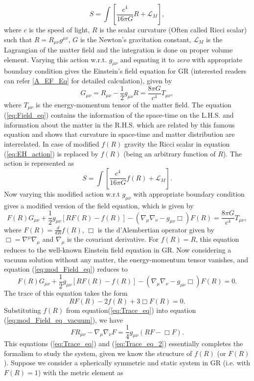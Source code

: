 \documentclass[12pt,a4paper,oneside]{book}
\newcommand{\eq}[2]{\begin{equation} \label{eq:#1} #2 \end{equation}}
\newcommand{\Eref}[1]{(\ref{eq:#1})}
\begin{document}
\eq{EH_action}{S = \int \left[ \frac{c^4}{16\pi G}R + \mathcal{L}_M\right], }
where $c$ is the speed of light, $R$ is the scalar curvature (Often called Ricci scalar) such that $R = R_{\mu\nu}g^{\mu\nu}$, $G$ is the Newton's gravitation constant, $\mathcal{L}_M$ is the Lagrangian of the matter field and the integration is done on proper volume element. Varying this action w.r.t. $g_{\mu\nu}$ and equating it to $zero$ with appropriate boundary condition gives the Einstein's field equation for GR (interested readers can refer \ref{A_EF_Eq} for detailed calculation), given by
\eq{Field_eq}{G_{\mu\nu} = R_{\mu\nu}-\frac{1}{2}g_{\mu\nu}R = \frac{8\pi G}{c^4}T_{\mu\nu},}
where $T_{\mu\nu}$ is the energy-momentum tensor of the matter field. The equation \Eref{Field_eq} contains the information of the space-time on the L.H.S. and information about the matter in the R.H.S. which are related by this famous equation and shows that curvature in space-time and matter distribution are interrelated. In case of modified $f(R)$ gravity the Ricci scalar in equation \Eref{EH_action} is replaced by $f(R)$ (being an arbitrary function of $R$). The action is represented as
\eq{mod_action}{S = \int \left[ \frac{c^4}{16\pi G}f(R) + \mathcal{L}_M\right]. }
Now varying this modified action w.r.t $g_{\mu\nu}$ with appropriate boundary condition gives a modified version of the field equation, which is given by \cite{Felice_Tsujikawa_10, Nojiri_Odintsov_Oikonomou_17}
\eq{mod_Field_eq}{
F(R)G_{\mu \nu}+\frac{1}{2}g_{\mu \nu}[R F(R)-f(R)]-(\nabla_\mu\nabla_\nu-g_{\mu \nu}\Box)F(R) =\frac{8\pi G}{c^4}T_{\mu \nu},}
where $F(R) = \frac{d}{dR}f(R)$, $\Box$ is the d’Alembertian operator given by $\Box = \nabla^\mu\nabla_\mu$ and $\nabla_\mu$ is the covariant derivative. For $f(R) = R$, this equation reduces to the well-known Einstein field equation in GR.
Now considering a vacuum solution without any matter, the energy-momentum tensor vanishes, and equation \Eref{mod_Field_eq} reduces to
\eq{mod_Field_eq_vacuum}{
F(R)G_{\mu\nu}+\frac{1}{2}g_{\mu\nu}\left[R F(R)-f(R)\right]-\left(\nabla_\mu\nabla_\nu-g_{\mu\nu}\Box\right)F(R) =0.}
The trace of this equation takes the form 
\eq{Trace_eq}{RF(R)-2f(R)+3 \Box F(R) = 0.}
Substituting $f(R)$ from equation\Eref{Trace_eq} into equation \Eref{mod_Field_eq_vacuum}, we have
\eq{Trace_eq_2}{FR_{\mu\nu}-\nabla_\mu\nabla_\nu F = \frac{1}{4}g_{\mu\nu}\left(RF-\Box F\right).}
This equations \Eref{Trace_eq} and \Eref{Trace_eq_2} essentially completes the formalism to study the system, given we know the structure of $f(R)$ (or $F(R)$). Suppose we consider a spherically symmetric and static system in GR (i.e. with $F(R) = 1$) with the metric element as
\end{document}
